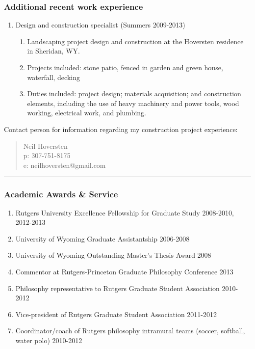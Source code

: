 \documentclass[10pt]{article}
\begin{document}
\subsubsection*{Additional recent work experience}

\begin{enumerate}[$\;$]
  \item Design and construction specialist (Summers 2009-2013)
    \begin{enumerate}[$\blacktriangleright$]
    \item Landscaping project design and construction at the Hoversten residence in Sheridan, WY.
    \item Projects included: stone patio, fenced in garden and green house, waterfall, decking
    \item Duties included: project design; materials acquisition; and construction elements, including the use of heavy machinery and power tools, wood working, electrical work, and plumbing.
  \end{enumerate}
\end{enumerate}

Contact person for information regarding my construction project experience:
\begin{quote}
Neil Hoversten \\
p: 307-751-8175 \\
e: neilhoversten@gmail.com
\end{quote}

\hrule

\subsubsection*{Academic Awards \& Service}

\begin{enumerate}[$\blacktriangleright$]
  \item Rutgers University Excellence Fellowship for Graduate Study 2008-2010, 2012-2013
  \item University of Wyoming Graduate Assistantship 2006-2008
  \item University of Wyoming Outstanding Master's Thesis Award 2008
  \item Commentor at Rutgers-Princeton Graduate Philosophy Conference 2013
  \item Philosophy representative to Rutgers Graduate Student Association 2010-2012
  \item Vice-president of Rutgers Graduate Student Association 2011-2012
  \item Coordinator/coach of Rutgers philosophy intramural teams (soccer, softball, water polo) 2010-2012
\end{enumerate}
\end{document}

